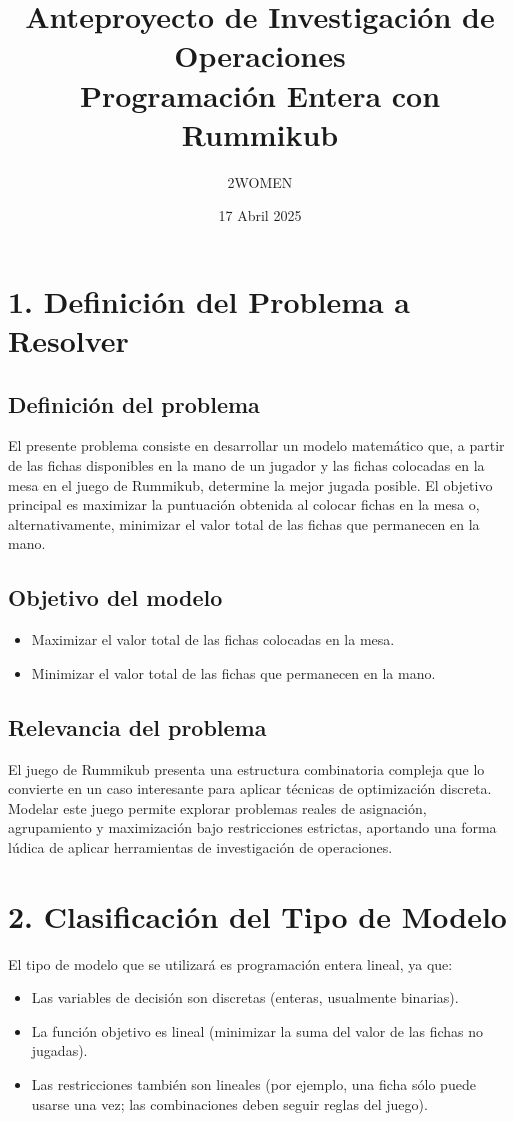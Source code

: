 \documentclass[12pt]{article}
\title{Anteproyecto de Investigación de Operaciones\\\large{Programación Entera con Rummikub}}
\author{2WOMEN}
\date{17 Abril 2025}
\begin{document}
\maketitle

\section*{1. Definición del Problema a Resolver}

\subsection*{Definición del problema}
El presente problema consiste en desarrollar un modelo matemático que, a partir de las fichas disponibles en la mano de un jugador y las fichas colocadas en la mesa en el juego de Rummikub, determine la mejor jugada posible. El objetivo principal es maximizar la puntuación obtenida al colocar fichas en la mesa o, alternativamente, minimizar el valor total de las fichas que permanecen en la mano.

\subsection*{Objetivo del modelo}
\begin{itemize}
    \item Maximizar el valor total de las fichas colocadas en la mesa.
    \item Minimizar el valor total de las fichas que permanecen en la mano.
\end{itemize}

\subsection*{Relevancia del problema}
El juego de Rummikub presenta una estructura combinatoria compleja que lo convierte en un caso interesante para aplicar técnicas de optimización discreta. Modelar este juego permite explorar problemas reales de asignación, agrupamiento y maximización bajo restricciones estrictas, aportando una forma lúdica de aplicar herramientas de investigación de operaciones.

\section*{2. Clasificación del Tipo de Modelo}
El tipo de modelo que se utilizará es programación entera lineal, ya que:

\begin{itemize}
    \item Las variables de decisión son discretas (enteras, usualmente binarias).
    \item La función objetivo es lineal (minimizar la suma del valor de las fichas no jugadas).
    \item Las restricciones también son lineales (por ejemplo, una ficha sólo puede usarse una vez; las combinaciones deben seguir reglas del juego).
\end{itemize}
\end{document}
